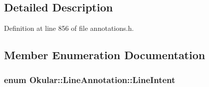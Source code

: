 \subsection{Detailed Description}


Definition at line 856 of file annotations.\+h.



\subsection{Member Enumeration Documentation}
\hypertarget{classOkular_1_1LineAnnotation_a80458e2d982d5ef91ff18b850b34489f}{
\subsubsection[{Line\+Intent}]{\setlength{\rightskip}{0pt plus 5cm}enum {\bf Okular\+::\+Line\+Annotation\+::\+Line\+Intent}}}\label{classOkular_1_1LineAnnotation_a80458e2d982d5ef91ff18b850b34489f}
